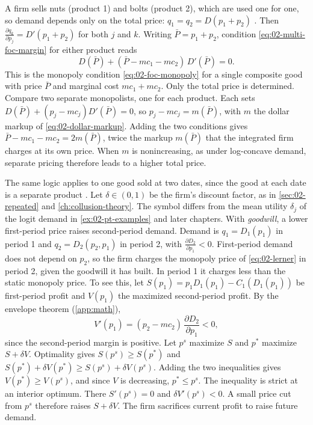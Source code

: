 \begin{example}\label{ex:02-complements}
A firm sells nuts (product 1) and bolts (product 2), which are used one for one, so demand depends only on the total
price: $q_1 = q_2 = D(p_1 + p_2)$ \citep[Exercise~1.5]{Tirole1988}. Then $\frac{\partial q_k}{\partial p_j} =
D'(p_1 + p_2)$ for both $j$ and $k$. Writing $\bar P = p_1 + p_2$, condition \eqref{eq:02-multi-foc-margin} for
either product reads
\[
  D(\bar P) + (\bar P - mc_1 - mc_2)\,D'(\bar P) = 0 .
\]
This is the monopoly condition \eqref{eq:02-foc-monopoly} for a single composite good with price $\bar P$ and marginal
cost $mc_1 + mc_2$. Only the total price is determined. Compare two separate monopolists, one for each product. Each
sets $D(\bar P) + (p_j - mc_j)D'(\bar P) = 0$, so $p_j - mc_j = m(\bar P)$, with $m$ the dollar markup of
\eqref{eq:02-dollar-markup}. Adding the two conditions gives $\bar P - mc_1 - mc_2 = 2m(\bar P)$, twice the markup
$m(\bar P)$ that the integrated firm charges at its own price. When $m$ is nonincreasing, as under log-concave demand,
separate pricing therefore leads to a higher total price.
\end{example}

 The same logic applies to one good sold at two dates, since the good at each
date is a separate product \citep[sec.~1.1.2]{Tirole1988}. Let $\delta \in (0, 1)$ be the firm's discount factor, as
in \cref{sec:02-repeated} and \cref{ch:collusion-theory}. The symbol differs from the mean utility $\delta_j$ of the
logit demand in \cref{ex:02-pt-examples} and later chapters. With \emph{goodwill}, a lower first-period price
raises second-period demand. Demand is $q_1 = D_1(p_1)$ in period 1 and $q_2 = D_2(p_2, p_1)$ in period 2,
with $\frac{\partial D_2}{\partial p_1} < 0$.
First-period demand does not depend on $p_2$, so the firm charges the monopoly price of
\eqref{eq:02-lerner} in period 2, given the goodwill it has built. In period 1 it charges less than the static
monopoly price. To see this, let $S(p_1) = p_1D_1(p_1) - C_1(D_1(p_1))$ be first-period profit and $V(p_1)$ the
maximized second-period profit. By the envelope theorem (\cref{app:math}),
\[
  V'(p_1) = (p_2 - mc_2)\,\frac{\partial D_2}{\partial p_1} < 0 ,
\]
since the second-period margin is positive. Let $p^s$ maximize $S$ and $p^*$ maximize $S + \delta V$. Optimality
gives $S(p^s) \ge S(p^*)$ and $S(p^*) + \delta V(p^*) \ge S(p^s) + \delta V(p^s)$. Adding the two inequalities gives
$V(p^*) \ge V(p^s)$, and since $V$ is decreasing, $p^* \le p^s$. The inequality is strict at an interior optimum.
There $S'(p^s) = 0$ and $\delta V'(p^s) < 0$. A small price cut from $p^s$ therefore raises $S + \delta V$. The
firm sacrifices current profit to raise future demand.

